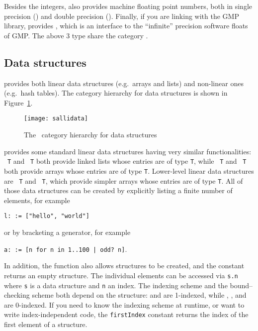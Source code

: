 Besides the integers, \libaldor{} also provides machine floating point numbers,
both in single precision () and double precision
(). Finally, if you are linking with the
GMP library, \libaldor{} provides , which is an interface
to the ``infinite'' precision software floats of GMP.
The above 3 type share the category .

\subsection{Data structures}
\libaldor{} provides both linear data structures (e.g.~arrays and lists)
and non-linear ones (e.g.~hash tables). The category hierarchy for
data structures is shown in Figure~\ref{fig:data}.

\begin{figure}[htb!]
\begin{latexonly}
\end{latexonly}
\begin{htmlonly}
\texttt{[image: sallidata]}
\end{htmlonly}
\caption{The \libaldor~category hierarchy for data structures}
\label{fig:data}
\end{figure}

\libaldor{} provides some standard linear
data structures having very similar functionalities:
~{\tt T} and ~{\tt T}
both provide linked lists
whose entries are of type {\tt T}, while
~{\tt T} and ~{\tt T} both provide
arrays whose entries are of type {\tt T}.
Lower-level linear data structures are ~{\tt T}
and ~{\tt T},
which provide simpler arrays whose entries are of type {\tt T}.
All of those data structures can be created by explicitly listing a
finite number of elements, for example\\
\centerline{{\tt l:  := ["hello", "world"] }}
or by bracketing a generator, for example\\
\centerline{ {\tt a:  :=
[n for n in 1..100 | odd?~n]}.}
In addition, the function 
also allows structures to be created, and the constant
returns an empty structure. The individual elements can
be accessed via {\tt s.n} where {\tt s} is a data structure and
{\tt n} an index. The indexing scheme and the bound--checking scheme
both depend on the structure:
 and  are 1-indexed, while
, , 
and  are 0-indexed.
If you need to know the indexing scheme at runtime,
or want to write index-independent code, the {\tt firstIndex} constant
returns the index of the first element of a structure.

